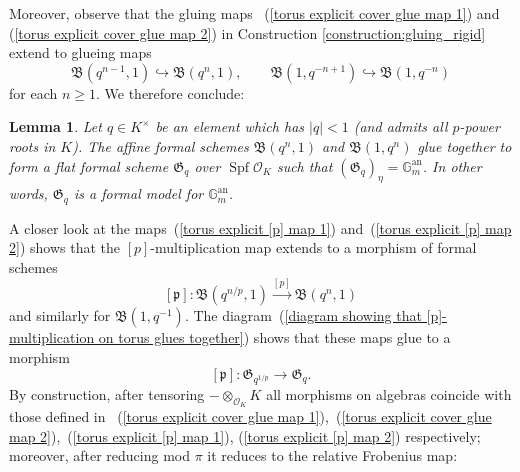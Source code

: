 \documentclass[10pt,oneside]{amsart}
\newtheorem{lemma}[theorem]{Lemma}
\theoremstyle{definition}
\begin{document}
Moreover, observe that the gluing maps ~(\ref{torus explicit cover glue map 1}) and (\ref{torus explicit cover glue map 2}) in Construction \ref{construction:gluing_rigid}  extend to glueing maps 
$$\mathfrak B(q^{n-1},1)\hookrightarrow \mathfrak B(q^{n},1), \qquad \mathfrak B(1,q^{-n+1})\hookrightarrow \mathfrak B(1,q^{-n})$$ for each $n \ge 1$. We therefore conclude:

	\begin{lemma}\label{formal model of torus}
	Let $q \in K^\times$ be an element which has $|q| < 1$ (and admits all $p$-power roots in $K$). The affine formal schemes $\mathfrak B(q^n,1)$ and $\mathfrak B(1,q^n)$ glue together to form a flat formal scheme $\mathfrak G_q$ over $\operatorname{Spf} \mathcal O_K$ such that $(\mathfrak G_q)_\eta = \mathbb G_m^{\operatorname{an}}$. In other words, $\mathfrak G_q$ is a formal model for $\mathbb G_m^{\operatorname{an}}$.
	\end{lemma}

         A closer look at the maps~(\ref{torus explicit [p] map 1}) and~(\ref{torus explicit [p] map 2}) shows that the $[p]$-multiplication map extends to a morphism of formal schemes 
	\[ [\mathfrak p] : \mathfrak B(q^{n/p},1)\xrightarrow{[p]} \mathfrak B(q^n,1)\]
	and similarly for $\mathfrak B(1,q^{-1})$. The diagram~(\ref{diagram showing that [p]-multiplication on torus glues together}) shows that these maps glue to a morphism
	\[[\mathfrak p]: \mathfrak G_{q^{1/p}}\rightarrow  \mathfrak G_q.\]
	By construction, after tensoring $-\otimes_{\mathcal O_K} K$ all morphisms on algebras coincide with those defined in ~(\ref{torus explicit cover glue map 1}),~(\ref{torus explicit cover glue map 2}),~(\ref{torus explicit [p] map 1}), (\ref{torus explicit [p] map 2}) respectively; moreover,  after reducing mod $\pi$ it reduces to the relative Frobenius map: 
 
\end{document}
